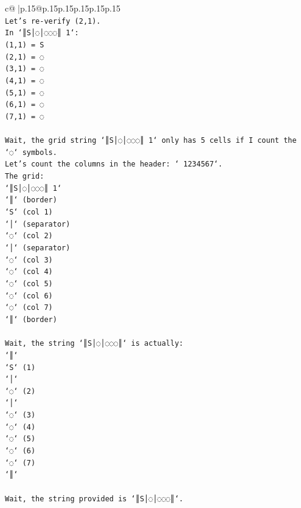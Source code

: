 \documentclass{article}
\begin{document}
{\begin{supertabular}{c@{$\;$}|p{.15\linewidth}@{}p{.15\linewidth}p{.15\linewidth}p{.15\linewidth}p{.15\linewidth}p{.15\linewidth}}
{{{\\ 
\texttt{Let's re{-}verify (2,1).} \\
\texttt{In `║S│◌│◌◌◌║ 1`:} \\
\texttt{(1,1) = S} \\
\texttt{(2,1) = ◌} \\
\texttt{(3,1) = ◌} \\
\texttt{(4,1) = ◌} \\
\texttt{(5,1) = ◌} \\
\texttt{(6,1) = ◌} \\
\texttt{(7,1) = ◌} \\
\\ 
\texttt{Wait, the grid string `║S│◌│◌◌◌║ 1` only has 5 cells if I count the `◌` symbols.} \\
\texttt{Let's count the columns in the header: ` 1234567`.} \\
\texttt{The grid:} \\
\texttt{`║S│◌│◌◌◌║ 1`} \\
\texttt{`║` (border)} \\
\texttt{`S` (col 1)} \\
\texttt{`│` (separator)} \\
\texttt{`◌` (col 2)} \\
\texttt{`│` (separator)} \\
\texttt{`◌` (col 3)} \\
\texttt{`◌` (col 4)} \\
\texttt{`◌` (col 5)} \\
\texttt{`◌` (col 6)} \\
\texttt{`◌` (col 7)} \\
\texttt{`║` (border)} \\
\\ 
\texttt{Wait, the string `║S│◌│◌◌◌║` is actually:} \\
\texttt{`║`} \\
\texttt{`S` (1)} \\
\texttt{`│`} \\
\texttt{`◌` (2)} \\
\texttt{`│`} \\
\texttt{`◌` (3)} \\
\texttt{`◌` (4)} \\
\texttt{`◌` (5)} \\
\texttt{`◌` (6)} \\
\texttt{`◌` (7)} \\
\texttt{`║`} \\
\\ 
\texttt{Wait, the string provided is `║S│◌│◌◌◌║`.} \\
}}}
\end{supertabular}}
\end{document}
